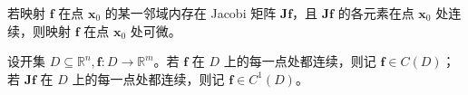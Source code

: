 \begin{theorem}
  若映射 $\bm{f}$ 在点 $\bm{x}_0$ 的某一邻域内存在 Jacobi 矩阵 $\bm{Jf}$，且 $\bm{Jf}$ 的各元素在点 $\bm{x}_0$ 处连续，则映射 $\bm{f}$ 在点 $\bm{x}_0$ 处可微。
\end{theorem}

\begin{definition}
  设开集 $D \subseteq \mathbb{R}^n, \bm{f}: D \to \mathbb{R}^m$。若 $\bm{f}$ 在 $D$ 上的每一点处都连续，则记 $\bm{f} \in C(D)$；若 $\bm{Jf}$ 在 $D$ 上的每一点处都连续，则记 $\bm{f} \in C^{1}(D)$。
\end{definition}





\section{}







\section{}







\section{}







\section{}







\section{}







\section{}






